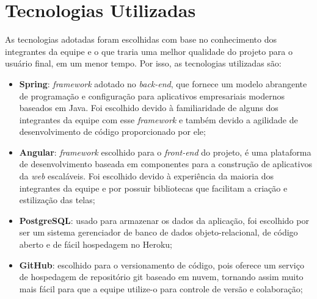 \section{Tecnologias Utilizadas}
As tecnologias adotadas foram escolhidas com base no conhecimento dos integrantes da equipe e o que traria uma melhor qualidade do projeto para o usuário final, em um menor tempo. Por isso, as tecnologias utilizadas são:

\begin{itemize}
\item{\textbf{Spring}}: \textit{\gls{framework}} adotado no \textit{\gls{back-end}}, que fornece um modelo abrangente de programação e configuração para aplicativos empresariais modernos baseados em Java. Foi escolhido devido à familiaridade de alguns dos integrantes da equipe com esse \textit{\gls{framework}} e também devido a agilidade de desenvolvimento de código proporcionado por ele;

\item{\textbf{Angular}}: \textit{\gls{framework}} escolhido para o \textit{\gls{front-end}} do projeto, é uma plataforma de desenvolvimento baseada em componentes para a construção de aplicativos da \textit{\gls{web}} escaláveis. Foi escolhido devido à experiência da maioria dos integrantes da equipe e por possuir bibliotecas que facilitam a criação e estilização das telas;

\item{\textbf{PostgreSQL}}: usado para armazenar os dados da aplicação, foi escolhido por ser um sistema gerenciador de banco de dados objeto-relacional, de código aberto e de fácil hospedagem no Heroku;

\begin{comment}
\item{\textbf{MySQL}}: escolhido para o armazenamento de dados. Esse é o banco de dados de código aberto mais popular do mundo. Com seu desempenho comprovado, confiabilidade e facilidade de uso, o MySQL se tornou a principal escolha de banco de dados para aplicativos baseados na web, usados por propriedades da \textit{\gls{web}} de alto perfil, incluindo Facebook, Twitter, YouTube, Yahoo! dentre outros \cite{mysql:2021}.
\end{comment}

\item{\textbf{GitHub}}: escolhido para o versionamento de código, pois oferece um serviço de hospedagem de repositório \gls{git} baseado em nuvem, tornando assim muito mais fácil para que a equipe utilize-o para controle de versão e colaboração;



\end{itemize}
